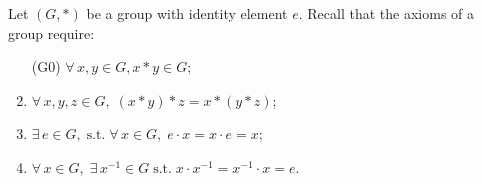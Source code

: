 \documentclass[11pt,openany]{article}
\begin{document}
\begin{note}
Let \( (G, \ast) \) be a group with identity element \( e \). Recall that the axioms of a group require:
\begin{enumerate}[(G1)]
	\item[(G0)] $\forall\, x, y \in G,  x \ast y\in G$;
	\item $\forall\, x, y, z \in G,\;  (x \ast y) \ast z = x \ast (y\ast z)$;
	\item $\exists\, e \in G,\; \text{s.t.}\; \forall\, x \in G,\; e \cdot x = x \cdot e = x$;
	\item $\forall\, x \in G,\; \exists\, x^{-1} \in G\; \text{s.t.}\; x \cdot x^{-1} = x^{-1} \cdot x = e$.
\end{enumerate}
\end{note}
\end{document}
